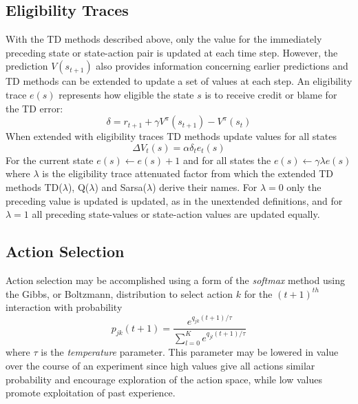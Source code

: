 \subsection{Eligibility Traces}
With the TD methods described above, only the value for the immediately
preceding state or state-action pair is updated at each time step.  However,
the prediction $V(s_{t+1})$ also provides information concerning earlier
predictions and TD methods can be extended to update a set of values at each step.  An eligibility trace $e(s)$ represents how eligible the state $s$ is to receive
credit or blame for the TD error:
\begin{equation}
\delta = r_{t+1} + \gamma V^\pi(s_{t+1}) - V^\pi(s_t)
\end{equation}
When extended with eligibility traces TD methods update values for all states
\begin{equation}
\Delta V_t(s) = \alpha \delta_t e_t(s)
\end{equation}
For the current state $e(s) \leftarrow e(s) + 1$ and for all states the
$e(s) \leftarrow \gamma \lambda e(s)$ where $\lambda$ is the eligibility trace
attenuated factor from which the extended TD methods TD($\lambda$),
Q($\lambda$) and Sarsa($\lambda$) derive their names. For $\lambda = 0$ only
the preceding value is updated is updated, as in the unextended definitions,
and for $\lambda = 1$ all preceding state-values or state-action values are
updated equally.

\subsection{Action Selection}
Action selection may be accomplished using a form of the \textit{softmax}
method \cite{suttonbarto:1998} using the Gibbs, or Boltzmann, distribution to select
action $k$ for the $(t+1)^{th}$ interaction with probability
\begin{equation}
p_{jk}(t+1) = \frac{e^{q_{jk}(t+1)/\tau}}{\sum_{l=0}^K e^{q_{jl}(t+1)/\tau}}
\end{equation}
where $\tau$ is the \textit{temperature} parameter.  This parameter may be
lowered in value over the course of an experiment since high values give all
actions similar probability and encourage exploration of the action space,
while low values promote exploitation of past experience.

